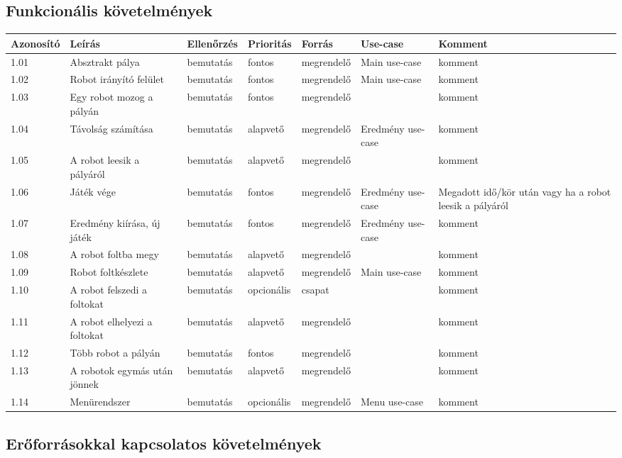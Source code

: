 \subsection{Funkcionális követelmények}


\begin{longtable}{| l | l | l | l | l | l | l |}
\hline
\textbf{Azonosító}   & \textbf{Leírás} & \textbf{Ellenőrzés} & \textbf{Prioritás} & \textbf{Forrás} & \textbf{Use-case} & \textbf{Komment} \tabularnewline
\hline\hline
1.01 & Absztrakt pálya & bemutatás & fontos & megrendelő & Main use-case & komment \tabularnewline
\hline
1.02 & Robot irányító felület & bemutatás & fontos & megrendelő & Main use-case & komment \tabularnewline
\hline
1.03 & Egy robot mozog a pályán & bemutatás & fontos & megrendelő &  & komment \tabularnewline
\hline
1.04 & Távolság számítása & bemutatás & alapvető & megrendelő & Eredmény use-case & komment \tabularnewline
\hline
1.05 & A robot leesik a pályáról & bemutatás & alapvető & megrendelő &  & komment \tabularnewline
\hline
1.06 & Játék vége & bemutatás & fontos & megrendelő & Eredmény use-case & Megadott idő/kör után vagy ha a robot leesik a pályáról \tabularnewline
\hline
1.07 & Eredmény kiírása, új játék & bemutatás & fontos & megrendelő & Eredmény use-case & komment \tabularnewline
\hline
1.08 & A robot foltba megy& bemutatás & alapvető & megrendelő &  & komment \tabularnewline
\hline
1.09 & Robot foltkészlete & bemutatás & alapvető & megrendelő & Main use-case & komment \tabularnewline
\hline
1.10 & A robot felszedi a foltokat & bemutatás & opcionális & csapat &  & komment \tabularnewline
\hline
1.11 & A robot elhelyezi a foltokat & bemutatás & alapvető & megrendelő &  & komment \tabularnewline
\hline
1.12 & Több robot a pályán & bemutatás & fontos & megrendelő &  & komment \tabularnewline
\hline
1.13 & A robotok egymás után jönnek & bemutatás & alapvető & megrendelő &  & komment \tabularnewline
\hline
1.14 & Menürendszer & bemutatás & opcionális & megrendelő & Menu use-case & komment \tabularnewline
\hline
\end{longtable}

\subsection{Erőforrásokkal kapcsolatos követelmények}

